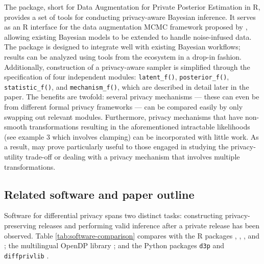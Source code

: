 The  package, short for Data Augmentation for Private Posterior Estimation in R, provides a set of tools for conducting
privacy-aware Bayesian inference. It serves as an R
interface for the data augmentation MCMC framework proposed by \citet{Ju2022},
allowing existing Bayesian models to be extended to handle
noise-infused data. The package is designed to integrate well with existing Bayesian workflows;
results can be analyzed using tools from the  \citep{rstan_pkg} ecosystem in a drop-in fashion. Additionally,
construction of a privacy-aware sampler is simplified
through the specification of four independent modules: \texttt{latent\_f()}, \texttt{posterior\_f()}, \texttt{statistic\_f()},
and \texttt{mechanism\_f()}, which are described in detail later in the paper.
The benefits are twofold: several privacy mechanisms --- these can even be from different formal privacy frameworks ---
can be compared easily by only swapping out relevant modules. Furthermore, privacy mechanisms
that have non-smooth transformations resulting in the aforementioned intractable likelihoods
(see example 3 which involves clamping) can be incorporated with little work. As a result,
 may prove particularly useful to those engaged in studying the privacy-utility trade-off or dealing with a privacy mechanism that involves multiple transformations.

\subsection{Related software and paper outline}\label{sec:related-software}

Software for differential privacy spans two distinct tasks: constructing
privacy-preserving releases and performing valid inference after a private
release has been observed. Table \ref{tab:software-comparison} compares
 with the R packages  \citep{tidydp_pkg},
 \citep{DPpack_pkg},  \citep{diffpriv_pkg}, and
 \citep{SimBaRepro_pkg}; the multilingual OpenDP library
\citep{opendp_pkg}; and the Python packages \texttt{d3p} \citep{d3p_pkg} and \texttt{diffprivlib}
\citep{diffprivlib_pkg}.

